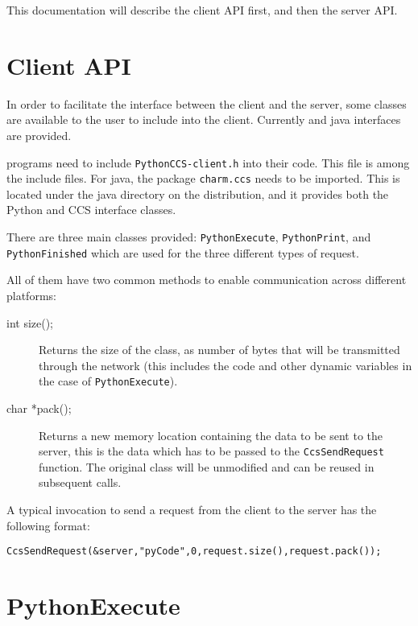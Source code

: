 This documentation will describe the client API first, and then the server API. 


\section{Client API}

\label{pythonClient}

In order to facilitate the interface between the client and the server, some
classes are available to the user to include into the client. Currently \CC{} and
java interfaces are provided.

\CC{} programs need to include \texttt{PythonCCS-client.h} into their
code. This file is among the \charmpp{} include files. For java, the package
\texttt{charm.ccs} needs to be imported. This is located under the java
directory on the \charmpp{} distribution, and it provides both the Python and
CCS interface classes.

There are three main classes provided: \texttt{PythonExecute},
\texttt{PythonPrint}, and \texttt{PythonFinished} which are used for the three
different types of request.

All of them have two common methods to enable communication across different platforms:

\begin{description}

\item[int size();]
Returns the size of the class, as number of bytes that will be
transmitted through the network (this includes the code and other dynamic
variables in the case of \texttt{PythonExecute}).

\item[char *pack();]
Returns a new memory location containing the data to be sent to the server, this
is the data which has to be passed to the \texttt{CcsSendRequest} function. The
original class will be unmodified and can be reused in subsequent calls.

\end{description}

A typical invocation to send a request from the client to the server has the
following format:

\begin{alltt}
CcsSendRequest (&server, "pyCode", 0, request.size(), request.pack());
\end{alltt}

\section{PythonExecute}
\label{pythonExecute}

